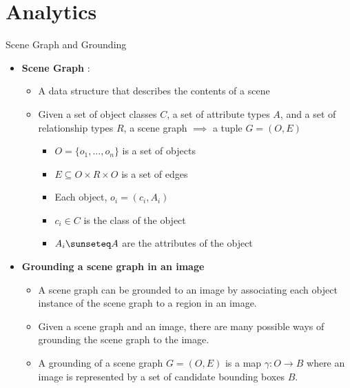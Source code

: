 \documentclass{IFES-beamer}
\begin{document}
\section{Analytics}

    \begin{frame}{Scene Graph and Grounding}
        \begin{itemize}
            \item \textbf{Scene Graph} :
                \begin{itemize}
                    \item A data structure that describes the contents of a scene
                    \item Given a set of object classes $C$, a set of attribute types $A$, and a set of relationship types $R$, a scene graph $\implies$ a tuple $G = (O, E)$ 
                        \begin{itemize}
                            \item $O = \{o_1, . . . , o_n\}$ is a set of objects
                            \item $E \subseteq O\times R\times O$ is a set of edges
                            \item  Each object, $o_i = (c_i, A_i)$ 
                            \item $c_i \in C$ is the class of the object
                            \item $A_i \sunseteq A$ are the attributes of the object
                        \end{itemize}  
                \end{itemize}
        \end{itemize}
        \begin{itemize}
            \item \textbf{Grounding a scene graph in an image}
                \begin{itemize}
                    \item A scene graph can be grounded to an image by associating each object instance of the scene graph to a region in an image.
                    \item Given a scene graph and an image, there are many possible ways of grounding the scene graph to the image.
                    \item A grounding of a scene graph $G = (O, E)$ is a map $\gamma : O \rightarrow B$ where an image is represented by a set of candidate bounding boxes $B$.
                \end{itemize}
        \end{itemize}
    \end{frame}
    
\end{document}
